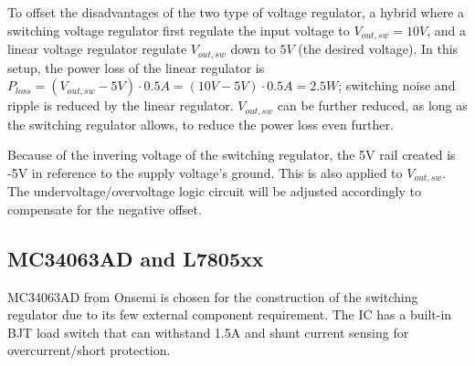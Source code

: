 \documentclass[../main.tex]{subfiles}
\begin{document}
    \justify
    To offset the disadvantages of the two type of voltage regulator, a hybrid where a switching voltage regulator first regulate the input voltage to $V_{out,sw}=10V$, and a linear voltage regulator regulate $V_{out,sw}$ down to $5V$ (the desired voltage). In this setup, the power loss of the linear regulator is $P_{loss} = (V_{out,sw} - 5V) \cdot 0.5A = (10V - 5V) \cdot 0.5A = 2.5W$; switching noise and ripple is reduced by the linear regulator. $V_{out,sw}$ can be further reduced, as long as the switching regulator allows, to reduce the power loss even further.

    \justify
    Because of the invering voltage of the switching regulator, the 5V rail created is -5V in reference to the supply voltage's ground. This is also applied to $V_{out,sw}$. The undervoltage/overvoltage logic circuit will be adjusted accordingly to compensate for the negative offset.

    \subsection{MC34063AD and L7805xx}

    \justify
    MC34063AD from Onsemi \cite{MC34063AD} is chosen for the construction of the switching regulator due to its few external component requirement. The IC has a built-in BJT load switch that can withstand 1.5A and shunt current sensing for overcurrent/short protection.
\end{document}
